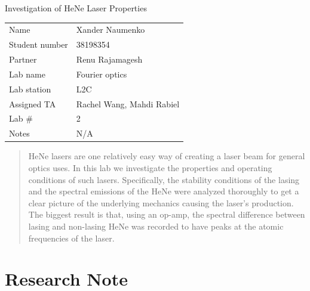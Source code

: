 \documentclass[letterpaper, reqno,11pt]{article}
\begin{document}
\begin{titlepage}
\centering


\Large Investigation of HeNe Laser Properties

\normalsize




\begin{tabular}{ll}
Name & Xander Naumenko \\[2ex]
Student number & 38198354 \\[2ex]
Partner & Renu Rajamagesh \\[2ex]
Lab name & Fourier optics \\[2ex]
Lab station  & L2C \\[2ex]
Assigned TA            & Rachel Wang, Mahdi Rabiel \\[2ex]
Lab \#            & 2 \\[2ex]
Notes &  N/A
\end{tabular}


\begin{abstract}
    HeNe lasers are one relatively easy way of creating a laser beam for general optics uses. In this lab we investigate the properties and operating conditions of such lasers. Specifically, the stability conditions of the lasing and the spectral emissions of the HeNe were analyzed thoroughly to get a clear picture of the underlying mechanics causing the laser's production. The biggest result is that, using an op-amp, the spectral difference between lasing and non-lasing HeNe was recorded to have peaks at the atomic frequencies of the laser.
\end{abstract}

\end{titlepage}

\newpage

\section{Research Note}
\end{document}
